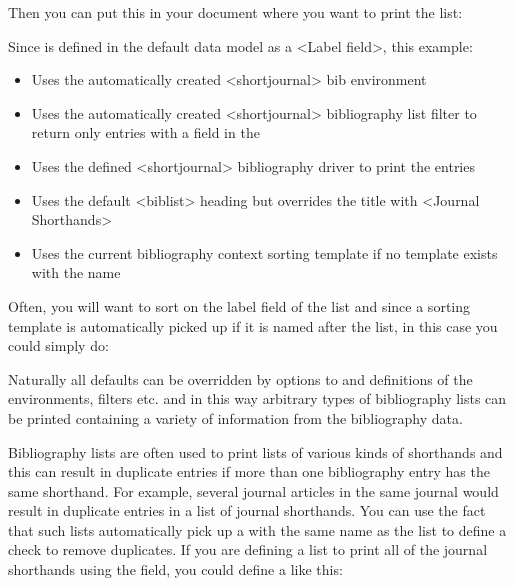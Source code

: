 \documentclass{ltxdockit}[2011/03/25]
\begin{document}
\begin{ltxsyntax}
\begin{ltxexample}
\end{ltxexample}
%
Then you can put this in your document where you want to print the list:

\begin{ltxexample}
\end{ltxexample}
%
Since  is defined in the default data model as a <Label field>, this example:
\begin{itemize}
\item Uses the automatically created <shortjournal> bib environment
\item Uses the automatically created <shortjournal> bibliography list filter to return only entries with a  field in the 
\item Uses the defined <shortjournal> bibliography driver to print the entries
\item Uses the default <biblist> heading but overrides the title with <Journal Shorthands>
\item Uses the current bibliography context sorting template if no template exists with the name 
\end{itemize}
%
Often, you will want to sort on the label field of the list and since a sorting template is automatically picked up if it is named after the list, in this case you could simply do:

\begin{ltxexample}
\end{ltxexample}

Naturally all defaults can be overridden by options to  and definitions of the environments, filters etc. and in this way arbitrary types of bibliography lists can be printed containing a variety of information from the bibliography data.
\end{ltxsyntax}

Bibliography lists are often used to print lists of various kinds of shorthands and this can result in duplicate entries if more than one bibliography entry has the same shorthand. For example, several journal articles in the same journal would result in duplicate entries in a list of journal shorthands. You can use the fact that such lists automatically pick up a  with the same name as the list to define a check to remove duplicates. If you are defining a list to print all of the journal shorthands using the  field, you could define a  like this:
\end{document}

